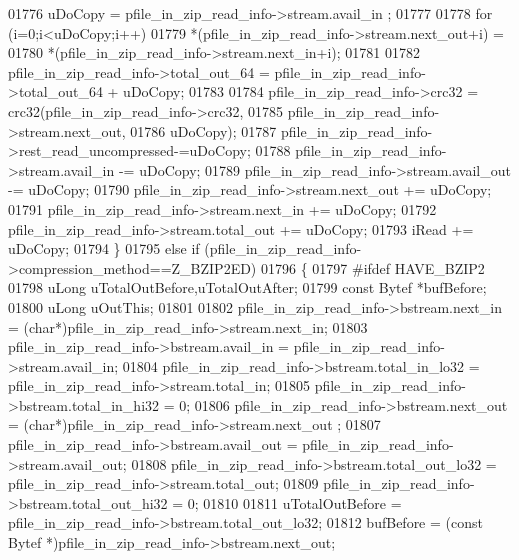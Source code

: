 \begin{DoxyCode}
01776                 uDoCopy = pfile\_in\_zip\_read\_info->stream.avail\_in ;
01777 
01778             \textcolor{keywordflow}{for} (i=0;i<uDoCopy;i++)
01779                 *(pfile\_in\_zip\_read\_info->stream.next\_out+i) =
01780                         *(pfile\_in\_zip\_read\_info->stream.next\_in+i);
01781 
01782             pfile\_in\_zip\_read\_info->total\_out\_64 = pfile\_in\_zip\_read\_info->total\_out\_64 + uDoCopy;
01783 
01784             pfile\_in\_zip\_read\_info->crc32 = crc32(pfile\_in\_zip\_read\_info->crc32,
01785                                 pfile\_in\_zip\_read\_info->stream.next\_out,
01786                                 uDoCopy);
01787             pfile\_in\_zip\_read\_info->rest\_read\_uncompressed-=uDoCopy;
01788             pfile\_in\_zip\_read\_info->stream.avail\_in -= uDoCopy;
01789             pfile\_in\_zip\_read\_info->stream.avail\_out -= uDoCopy;
01790             pfile\_in\_zip\_read\_info->stream.next\_out += uDoCopy;
01791             pfile\_in\_zip\_read\_info->stream.next\_in += uDoCopy;
01792             pfile\_in\_zip\_read\_info->stream.total\_out += uDoCopy;
01793             iRead += uDoCopy;
01794         \}
01795         \textcolor{keywordflow}{else} \textcolor{keywordflow}{if} (pfile\_in\_zip\_read\_info->compression\_method==Z\_BZIP2ED)
01796         \{
01797 \textcolor{preprocessor}{#ifdef HAVE\_BZIP2}
01798             uLong uTotalOutBefore,uTotalOutAfter;
01799             \textcolor{keyword}{const} Bytef *bufBefore;
01800             uLong uOutThis;
01801 
01802             pfile\_in\_zip\_read\_info->bstream.next\_in        = (\textcolor{keywordtype}{char}*)pfile\_in\_zip\_read\_info->stream.next\_in;
01803             pfile\_in\_zip\_read\_info->bstream.avail\_in       = pfile\_in\_zip\_read\_info->stream.avail\_in;
01804             pfile\_in\_zip\_read\_info->bstream.total\_in\_lo32  = pfile\_in\_zip\_read\_info->stream.total\_in;
01805             pfile\_in\_zip\_read\_info->bstream.total\_in\_hi32  = 0;
01806             pfile\_in\_zip\_read\_info->bstream.next\_out       = (\textcolor{keywordtype}{char}*)pfile\_in\_zip\_read\_info->stream.next\_out
      ;
01807             pfile\_in\_zip\_read\_info->bstream.avail\_out      = pfile\_in\_zip\_read\_info->stream.avail\_out;
01808             pfile\_in\_zip\_read\_info->bstream.total\_out\_lo32 = pfile\_in\_zip\_read\_info->stream.total\_out;
01809             pfile\_in\_zip\_read\_info->bstream.total\_out\_hi32 = 0;
01810 
01811             uTotalOutBefore = pfile\_in\_zip\_read\_info->bstream.total\_out\_lo32;
01812             bufBefore = (\textcolor{keyword}{const} Bytef *)pfile\_in\_zip\_read\_info->bstream.next\_out;

\end{DoxyCode}
